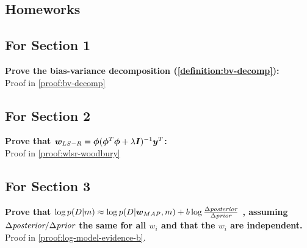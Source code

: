 \begin{appendices}
\newpage
\section{Homeworks}
\subsection{For Section 1}
\begin{question}
    \textbf{Prove the bias-variance decomposition (\cref{definition:bv-decomp}):} \\
    Proof in \cref{proof:bv-decomp}
\end{question}

\subsection{For Section 2}
\begin{question}
    \textbf{Prove that $\bm{w}_{LS-R} = \bm{\phi} ( \bm{\phi}^{T} \bm{\phi} + \lambda \bm{I})^{-1} \bm{y}^{T}$:} \\
    Proof in \cref{proof:wlsr-woodbury}
\end{question}

\subsection{For Section 3}
\begin{question}
    \textbf{Prove that $\log p(D|m) \approx \log p(D| \bm{w}_{MAP} , m) + b \log \frac{\Delta \textit{posterior}}{\Delta \textit{prior}}$ , assuming $\Delta \textit{posterior} / \Delta \textit{prior}$ the same for all $w_{i}$ and that the $w_{i}$ are independent.} \\
    Proof in \cref{proof:log-model-evidence-b}.
\end{question}


\end{appendices}
